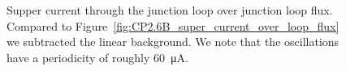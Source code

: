 \begin{figure}[ht]
	\centering
	
	\caption{Supper current through the junction loop over junction loop flux. Compared to Figure~\ref{fig:CP2.6B_super_current_over_loop_flux} we subtracted the linear background. We note that the oscillations have a periodicity of roughly \qty{60}{\micro\ampere}.}
	\label{fig:CP2.6B_super_current_over_phase_no_linear_background}
\end{figure}

